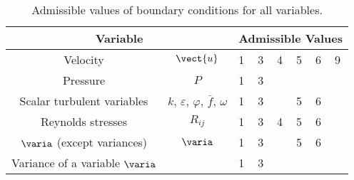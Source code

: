 \begin{table}
\begin{center}
\begin{tabular}{||c|c||p{}|p{}|p{}|p{}|p{}|p{}||}
\hline
\multicolumn{2}{||c||}{Variable}
        &\multicolumn{6}{c||}{Admissible Values}\\
\hline
Velocity                                 & $\vect{u}$                                                                         &  1& 3& 4& 5& 6& 9 \\
Pressure                                & $P$                                                                                    &  1& 3&  &  & & \\
Scalar turbulent variables     & $k$, $\varepsilon$, $\varphi$, $\bar{f}$, $\omega$        &  1& 3&  & 5& 6& \\
Reynolds stresses                 & $R_{ij}$                                                                              &  1& 3& 4& 5& 6& \\
$\varia$ (except variances)  &  $\varia$                                                                             &  1& 3&  & 5& 6& \\
Variance of a variable $\varia$ &                                                                                        &  1& 3&  &  & & \\
\hline
\end{tabular}
\end{center}
\caption{Admissible values of boundary conditions for all variables.}\label{tab:ICODCLadm_condli}
\end{table}

